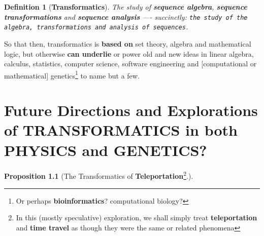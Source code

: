 \documentclass[a4paper, 18pt]{book} %
\newtheorem{defn}{Definition}
\newtheorem{prop}{Proposition}
\begin{document}
\begin{appendices}
\vspace{2em}

\begin{defn}[\textbf{Transformatics}]
\label{DEFTRANS2}
The study of \textbf{sequence algebra}, \textbf{sequence transformations} and \textbf{sequence analysis} ---- succinctly: \texttt{the study of the algebra, transformations and analysis of sequences}.
\end{defn}

\vspace{2em}
 
So that then, transformatics is \textbf{based on} set theory, algebra and mathematical logic, but otherwise \textbf{can underlie} or power old and new ideas in linear algebra, calculus, statistics, computer science, software engineering and [computational or mathematical] genetics\footnote{Or perhaps \textbf{bioinformatics}? computational biology?} to name but a few. 






\chapter{Future Directions and Explorations of TRANSFORMATICS in both PHYSICS and GENETICS?}
\label{SECFUTDIRECT}


\begin{prop}[The Transformatics of \textbf{Teleportation}\footnote{In this (mostly speculative) exploration, we shall simply treat \textbf{teleportation} and \textbf{time travel} as though they were the same or related phenomena}.]

\vspace{1em}


\end{prop}
\end{appendices}
\end{document}
